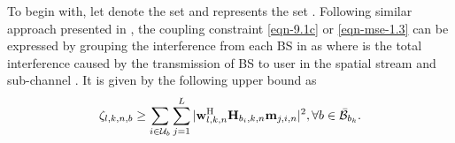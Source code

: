 To begin with, let  denote the set  and  represents the set . Following similar approach presented in \cite{pennanen2011decentralized,tolli2011decentralized}, the coupling constraint \eqref{eqn-9.1c} or \eqref{eqn-mse-1.3} can be expressed by grouping the interference from each \ac{BS} in  as
\iftoggle{single_column}{
\begin{IEEEeqnarray}{rCl}\label{eqn-decent-3}
\beta_{l,k,n} & \geq & \sum_{\substack{j = 1\\j \neq l}}^L |\mvec{w}{l,k,n}^\herm \mvec{H}{b_k,k,n} \mvec{m}{j,k,n} |^2 \nonumber \\
&\quad& + \sum_{i \in \mc{U}_{b_k} \backslash \{k\}} \sum_{j = 1}^L |\mvec{w}{l,k,n}^\herm \mvec{H}{b_k,k,n} \mvec{m}{j,i,n} |^2 + \sum_{b \in \bar{\mc{B}}_{b_k}} \zeta_{l,k,n,b} \; + \; \enoise,
\end{IEEEeqnarray}}{\allowdisplaybreaks
\begin{multline}\label{eqn-decent-3}
	\enoise + \sum_{\substack{j = 1,j \neq l}}^L |\mvec{w}{l,k,n}^\herm \mvec{H}{b_k,k,n} \mvec{m}{j,k,n} |^2 + \sum_{b \in \bar{\mc{B}}_{b_k}} \zeta_{l,k,n,b}  \\
	+ \sum_{i \in \mc{U}_{b_k} \backslash \{k\}} \sum_{j = 1}^L |\mvec{w}{l,k,n}^\herm \mvec{H}{b_k,k,n} \mvec{m}{j,i,n} |^2 \leq \beta_{l,k,n},
\end{multline}}
where  is the total interference caused by the transmission of \ac{BS}  to user  in the spatial stream  and sub-channel . It is given by the following upper bound as
\begin{equation} \label{inter_exp}
\zeta_{l,k,n,b} \geq \sum_{i \in \mc{U}_b} \sum_{j = 1}^L |\mvec{w}{l,k,n}^\herm \mvec{H}{b_i,k,n} \mvec{m}{j,i,n} |^2, \forall b \in \bar{\mc{B}}_{b_k}.
\end{equation}

